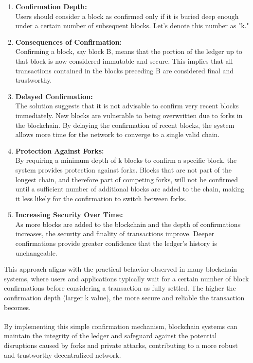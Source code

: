 \documentclass{report}
\begin{document}
\begin{enumerate}
	\item \textbf{Confirmation Depth:} \\Users should consider a block as confirmed only if it is buried deep enough under a certain number of subsequent blocks. Let's denote this number as "k."
	\item \textbf{Consequences of Confirmation:}\\Confirming a block, say block B, means that the portion of the ledger up to that block is now considered immutable and secure. This implies that all transactions contained in the blocks preceding B are considered final and trustworthy.
	\item \textbf{Delayed Confirmation:}\\The solution suggests that it is not advisable to confirm very recent blocks immediately. New blocks are vulnerable to being overwritten due to forks in the blockchain. By delaying the confirmation of recent blocks, the system allows more time for the network to converge to a single valid chain.
	\item \textbf{Protection Against Forks:}\\By requiring a minimum depth of k blocks to confirm a specific block, the system provides protection against forks. Blocks that are not part of the longest chain, and therefore part of competing forks, will not be confirmed until a sufficient number of additional blocks are added to the chain, making it less likely for the confirmation to switch between forks.
	\item \textbf{Increasing Security Over Time:}\\As more blocks are added to the blockchain and the depth of confirmations increases, the security and finality of transactions improve. Deeper confirmations provide greater confidence that the ledger's history is unchangeable.
\end{enumerate}
This approach aligns with the practical behavior observed in many blockchain systems, where users and applications typically wait for a certain number of block confirmations before considering a transaction as fully settled. The higher the confirmation depth (larger k value), the more secure and reliable the transaction becomes.\\\\
By implementing this simple confirmation mechanism, blockchain systems can maintain the integrity of the ledger and safeguard against the potential disruptions caused by forks and private attacks, contributing to a more robust and trustworthy decentralized network.\\\\
\end{document}
